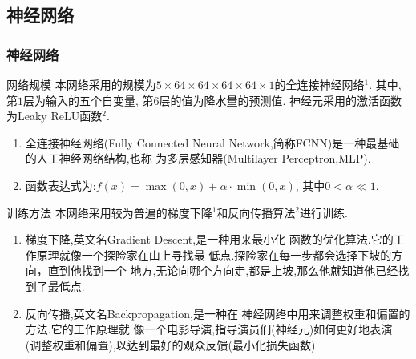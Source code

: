 \documentclass[10pt]{beamer}
\begin{document}
\subsection{神经网络}
\begin{frame}
	\frametitle{神经网络}
	\begin{block}{网络规模}
		本网络采用的规模为$5 \times 64 \times 64 \times 64 \times 64 \times 1$的全连接神经网络$^1$.
		其中, 第$1$层为输入的五个自变量, 第$6$层的值为降水量的预测值.
		神经元采用的激活函数为Leaky ReLU函数$^2$.
		\begin{enumerate}
			\item 全连接神经网络(Fully Connected Neural Network,简称FCNN)是一种最基础的人工神经网络结构,也称
			      为多层感知器(Multilayer Perceptron,MLP).
			\item 函数表达式为:\qquad$f(x)=\max(0, x) + \alpha \cdot \min(0, x)$, 其中$0 < \alpha \ll 1$.
		\end{enumerate}
	\end{block}
	\begin{block}{训练方法}
		本网络采用较为普遍的梯度下降$^1$和反向传播算法$^2$进行训练.
		\begin{enumerate}
			\item 梯度下降,英文名Gradient Descent,是一种用来最小化
			      函数的优化算法.它的工作原理就像一个探险家在山上寻找最
			      低点.探险家在每一步都会选择下坡的方向，直到他找到一个
			      地方,无论向哪个方向走,都是上坡,那么他就知道他已经找到了最低点.
			\item 反向传播,英文名Backpropagation,是一种在
			      神经网络中用来调整权重和偏置的方法.它的工作原理就
			      像一个电影导演,指导演员们(神经元)如何更好地表演
			      (调整权重和偏置),以达到最好的观众反馈(最小化损失函数)
		\end{enumerate}
	\end{block}
\end{frame}
\end{document}
